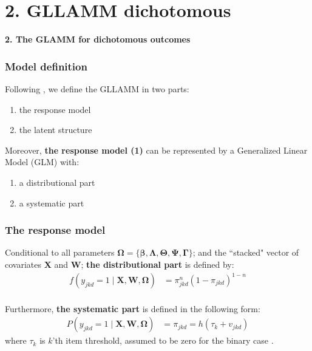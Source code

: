 \documentclass[arial,12pt,xcolor=dvipsnames]{beamer}
\begin{document}
\section{2. GLLAMM dichotomous}
%
\begin{frame}
	\textbf{2. The GLAMM for dichotomous outcomes}
\end{frame}
%
\begin{frame}
	\frametitle{Model definition}
	Following \citet{Rabe_et_al_2004a, Rabe_et_al_2004b}, we define the GLLAMM in two parts: 
	\begin{enumerate}
		\item the response model
		\item the latent structure
	\end{enumerate}
	\vspace{0.3cm} Moreover, \textbf{the response model (1)} can be represented by 
	a Generalized Linear Model (GLM) \cite{Nelder_et_al_1972, Nelder_et_al_1989} with:
	\begin{enumerate}
		\item a distributional part
		\item a systematic part
	\end{enumerate}
\end{frame}
%
\begin{frame}
	\frametitle{The response model}
	Conditional to all parameters $\pmb{\Omega} = \{ \pmb{\beta}, \pmb{\Lambda}, \pmb{\Theta}, \pmb{\Psi}, \pmb{\Gamma} \}$; and the ``stacked" vector of covariates $\mathbf{X}$ and $\mathbf{W}$; \textbf{the distributional part} is defined by:
	\begin{equation} \label{eq:distributional}
		\begin{split}
			f \left( y_{jkd}=1 \; | \; \mathbf{X}, \mathbf{W}, \pmb{\Omega} \right) &= \pi_{jkd}^{n} (1 - \pi_{jkd})^{1-n}
		\end{split}
	\end{equation} \\
	\vspace{0.3cm} Furthermore, \textbf{the systematic part} is defined in the following form:
	\begin{equation} \label{eq:systematic}
		\begin{split}
			P\left( y_{jkd}=1 \; | \; \mathbf{X}, \mathbf{W}, \pmb{\Omega} \right) &= \pi_{jkd} = h( \tau_{k} + v_{jkd} )
		\end{split}	
	\end{equation}
	where $\tau_{k}$ is $k$'th item threshold, assumed to be zero for the binary case \cite{Rabe_et_al_2004a}.
\end{frame}
\end{document}
